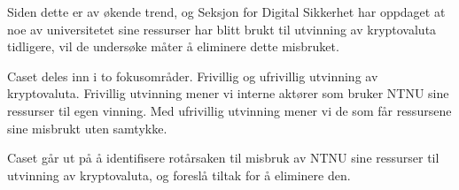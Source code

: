 Siden dette er av økende trend, og Seksjon for Digital Sikkerhet har oppdaget at noe av universitetet sine ressurser har blitt brukt til utvinning av kryptovaluta tidligere, vil de undersøke måter å eliminere dette misbruket. 

Caset deles inn i to fokusområder. Frivillig og ufrivillig utvinning av kryptovaluta. Frivillig utvinning mener vi interne aktører som bruker NTNU sine ressurser til egen vinning. Med ufrivillig utvinning mener vi de som får ressursene sine misbrukt uten samtykke. 

Caset går ut på å identifisere rotårsaken til misbruk av NTNU sine ressurser til utvinning av kryptovaluta, og foreslå tiltak for å eliminere den.
